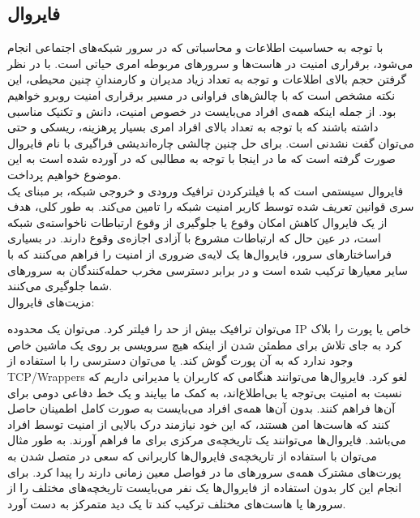 \subsection{فایروال}
با توجه به حساسیت اطلاعات و محاسباتی که در سرور شبکه‌های اجتماعی انجام می‌شود، برقراری امنیت در هاست‌ها و سرور‌های مربوطه امری حیاتی است. با در نظر گرفتن حجم بالای اطلاعات و توجه به تعداد زیاد مدیران و کارمندانِ چنین محیطی، این نکته مشخص است که با چالش‌های فراوانی در مسیر برقراری امنیت روبرو خواهیم بود. از جمله اینکه همه‌ی افراد می‌بایست در خصوص امنیت، دانش و تکنیک مناسبی داشته باشند که با توجه به تعداد بالای افراد امری بسیار پرهزینه، ریسکی و حتی می‌توان گفت نشدنی است. برای حل چنین چالشی چاره‌اندیشی فراگیری با نام فایروال صورت گرفته است که ما در اینجا با توجه به مطالبی که در  آورده شده است به این موضوع خواهیم پرداخت.\\
فایروال سیستمی است که با فیلترکردن ترافیک ورودی و خروجی شبکه، بر مبنای یک سری قوانین تعریف شده توسط کاربر امنیت شبکه را تامین می‌کند. به طور کلی، هدف از یک فایروال کاهش امکان وقوع یا جلوگیری از وقوع ارتباطات ناخواسته‌ی شبکه است، در عین حال که ارتباطات مشروع با آزادی اجازه‌ی وقوع دارند. در بسیاری فراساختارهای سرور، فایروال‌ها یک لایه‌ی ضروری از امنیت را فراهم می‌کنند که با سایر معیارها ترکیب شده است و در برابر دسترسی مخرب حمله‌کنندگان به سرورهای شما جلوگیری می‌کنند.\\
مزیت‌های فایروال:
\begin{itemize}
 می‌توان ترافیک بیش از حد را فیلتر کرد.
 می‌توان یک محدوده IP خاص یا پورت را بلاک کرد به جای تلاش برای مطمئن شدن از اینکه هیچ سرویسی بر روی یک ماشین خاص وجود ندارد که به آن پورت گوش کند. یا می‌توان دسترسی را با استفاده از TCP/Wrappers لغو کرد.
 فایروال‌ها می‌توانند هنگامی که کاربران یا مدیرانی داریم که نسبت به امنیت بی‌توجه‌ یا بی‌اطلاع‌اند، به کمک ما بیایند و یک خط دفاعی دومی برای آن‌ها فراهم کنند. بدون ‌‌آن‌ها همه‌ی افراد می‌بایست به صورت کامل اطمینان حاصل کنند که هاست‌ها امن هستند، که این خود نیازمند درک بالایی از امنیت توسط افراد می‌باشد.
 فایروال‌ها می‌توانند یک تاریخچه‌ی مرکزی برای ما فراهم آورند. به طور مثال می‌توان با استفاده از تاریخچه‌ی فایروال‌ها کاربرانی که سعی در متصل شدن به پورت‌های مشترک همه‌ی سرورهای ما در فواصل معین زمانی دارند را پیدا کرد. برای انجام این‌ کار بدون استفاده‌ از فایروال‌ها یک نفر می‌بایست تاریخچه‌های مختلف را از سرورها یا هاست‌های مختلف ترکیب کند تا یک دید متمرکز به دست آورد.
\end{itemize}

